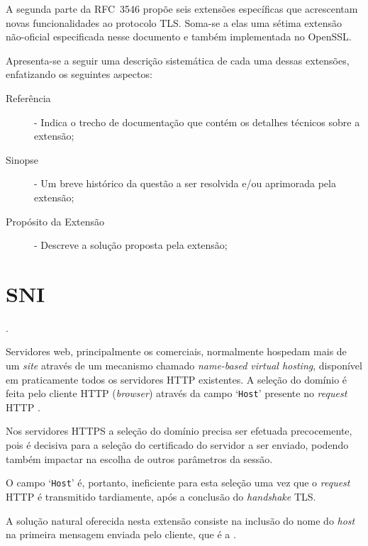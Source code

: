 A segunda parte da RFC~3546 propõe seis extensões específicas que acrescentam
novas funcionalidades ao protocolo TLS. Soma-se a elas uma sétima extensão
não-oficial especificada nesse documento e também implementada no OpenSSL.

Apresenta-se a seguir uma descrição sistemática de cada uma dessas extensões,
enfatizando os seguintes aspectos:

\begin{description}

\item[Referência] - Indica o trecho de documentação que contém os detalhes
técnicos sobre a extensão;

\item[Sinopse] - Um breve histórico da questão a ser resolvida e/ou aprimorada
pela extensão;

\item[Propósito da Extensão] - Descreve a solução proposta pela extensão;

\end{description}

\section{\acf{SNI}}

\begin{description}[\breaklabel]

\item[Referência]
	.
	
\item[Sinopse]
	Servidores web, principalmente os comerciais, normalmente hospedam mais de um \emph{site}
	através de um mecanismo chamado \emph{name-based virtual hosting}, disponível em praticamente
	todos os servidores HTTP existentes. A seleção do domínio é feita pelo cliente HTTP (\emph{browser})
	através da campo `\verb|Host|' presente no \emph{request} HTTP \cite[seção~14.23]{rfc_http}.

	Nos servidores HTTPS a seleção do domínio precisa ser efetuada precocemente, pois é
	decisiva para a seleção do certificado do servidor a ser enviado, podendo também impactar na
	escolha de outros parâmetros da sessão.

	O campo `\verb|Host|' é, portanto, ineficiente para esta seleção uma vez que o \emph{request}
	HTTP é transmitido tardiamente, após a conclusão do \emph{handshake} TLS.

\item[Propósito da Extensão]
	A solução natural oferecida nesta extensão consiste na inclusão do nome do \emph{host} na primeira
	mensagem enviada pelo cliente, que é a \tlsHsCh.

\end{description}


